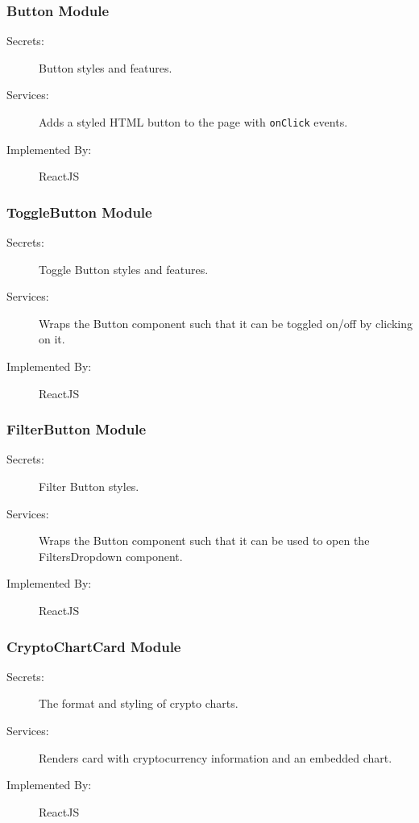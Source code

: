 \documentclass[12pt, titlepage]{article}
\begin{document}
\subsubsection{Button Module \label{mButtonModule}}
\begin{description}
\item[Secrets:]Button styles and features.
\item[Services:]Adds a styled HTML button to the page with \texttt{onClick} events.
\item[Implemented By:] ReactJS
\end{description}

\subsubsection{ToggleButton Module \label{mToggleButtonModule}}
\begin{description}
\item[Secrets:]Toggle Button styles and features.
\item[Services:]Wraps the Button component such that it can be toggled on/off by clicking on it.
\item[Implemented By:] ReactJS
\end{description}

\subsubsection{FilterButton Module \label{mFilterButtonModule}}
\begin{description}
\item[Secrets:]Filter Button styles.
\item[Services:]Wraps the Button component such that it can be used to open the FiltersDropdown component.
\item[Implemented By:] ReactJS
\end{description}

\subsubsection{CryptoChartCard Module \label{mCryptoChartCardModule}}
\begin{description}
\item[Secrets:]The format and styling of crypto charts.
\item[Services:]Renders card with cryptocurrency information and an embedded chart.
\item[Implemented By:] ReactJS
\end{description}
\end{document}

